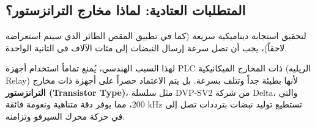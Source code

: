 \subsection{المتطلبات العتادية: لماذا مخارج الترانزستور؟}
لتحقيق استجابة ديناميكية سريعة (كما في تطبيق المقص الطائر الذي سيتم استعراضه لاحقاً)، يجب أن تصل سرعة إرسال النبضات إلى مئات الآلاف في الثانية الواحدة. 

لهذا السبب الهندسي، يُمنع تماماً استخدام أجهزة \textenglish{PLC} ذات المخارج الميكانيكية (الريليه \textenglish{Relay}) لأنها بطيئة جداً وتتلف بسرعة. بل يتم الاعتماد حصراً على أجهزة ذات مخارج \textbf{الترانزستور (\textenglish{Transistor Type})}، مثل سلسلة \textenglish{DVP-SV2} من شركة \textenglish{Delta}، والتي تستطيع توليد نبضات بترددات تصل إلى $200\text{ kHz}$، مما يوفر دقة متناهية ونعومة فائقة في حركة محرك السيرفو وتزامنه.